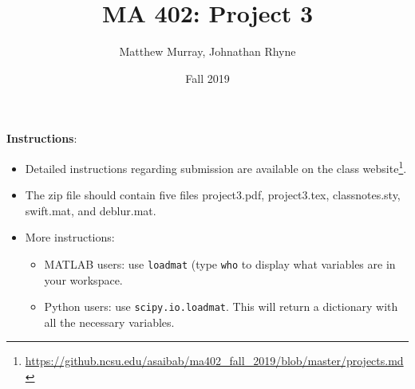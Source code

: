 \documentclass[answers,10pt]{exam}
\title{MA 402: Project 3}
\author{Matthew Murray, Johnathan Rhyne}
\date{Fall 2019}
\begin{document}
\maketitle
\textbf{Instructions}: 

\begin{itemize}
\item Detailed instructions regarding submission are available on the class website\footnote{\url{https://github.ncsu.edu/asaibab/ma402_fall_2019/blob/master/projects.md}}.
\item The zip file should contain five files project3.pdf, project3.tex, classnotes.sty, swift.mat, and deblur.mat. 

\item More instructions:
\begin{itemize}
\item MATLAB users: use \verb|loadmat| (type \verb|who| to display what variables are in your workspace. 
\item Python users: use \verb|scipy.io.loadmat|. This will return a dictionary with all the necessary variables.
\end{itemize}
\end{itemize}

\vspace{2mm}
\end{document}
